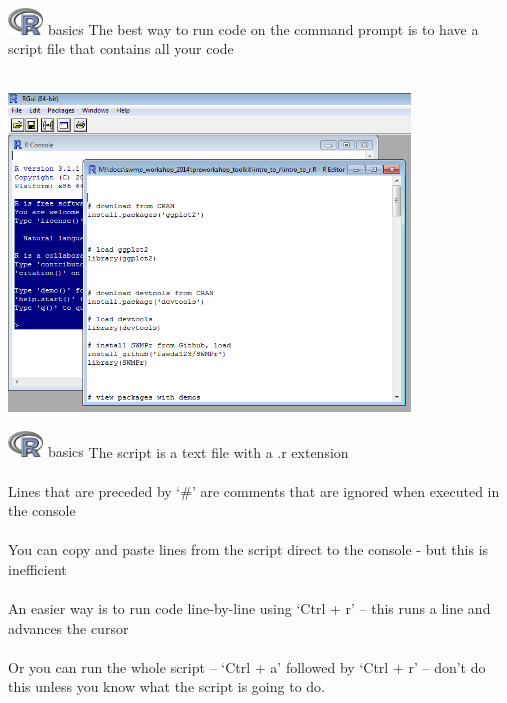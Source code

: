 \documentclass[xcolor=svgnames]{beamer}\usepackage[]{graphicx}\usepackage[]{color}
\begin{document}
\begin{frame}[fragile]{\includegraphics[width=0.07\textwidth]{Rlogo.jpg} \hspace{0.01in} basics}
The best way to run code on the command prompt is to have a script file that contains all your code \\~\\
\centerline{\includegraphics[width = 0.8\textwidth]{openscript2.png}}
\end{frame}

\begin{frame}[fragile]{\includegraphics[width=0.07\textwidth]{Rlogo.jpg} \hspace{0.01in} basics}
The script is a text file with a .r extension \\~\\
Lines that are preceded by `\#' are comments that are ignored when executed in the console \\~\\
You can copy and paste lines from the script direct to the console - but this is inefficient \\~\\
An easier way is to run code line-by-line using `Ctrl + r' -- this runs a line and advances the cursor\\~\\
Or you can run the whole script -- `Ctrl + a' followed by `Ctrl + r' -- don't do this unless you know what the script is going to do.
\end{frame}
\end{document}
